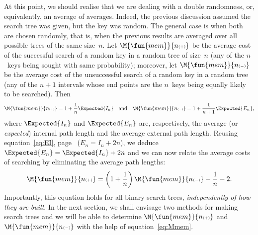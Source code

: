 At this point, we should realise that we are dealing with a double
randomness, or, equivalently, an average of averages. Indeed, the
previous discussion assumed the search tree was given, but the key was
random. The general case is when both are chosen randomly, that is,
when the previous results are averaged over all possible trees of the
same size~\(n\). Let \(\M{\fun{mem}}{n{\scriptscriptstyle (+)}}\)
 be the average
cost of the successful search of a random key in a random tree of
size~\(n\) (any of the \(n\)~keys being sought with same probability);
moreover, let \(\M{\fun{mem}}{n{\scriptscriptstyle
    (-)}}\) be the average cost of the unsuccessful search of a random
key in a random tree (any of the \(n+1\) intervals whose end points
are the \(n\)~keys being equally likely to be searched). Then
\begin{equation}
  \M{\fun{mem}}{n{\scriptscriptstyle (+)}}
  = 1 + \frac{1}{n}\Expected{I_n}
\quad\text{and}\quad
\M{\fun{mem}}{n{\scriptscriptstyle (-)}}
  = 1 + \frac{1}{n+1}\Expected{E_n},
\label{eq:Mmems}
\end{equation}
where \(\Expected{I_n}\) and \(\Expected{E_n}\) are, respectively, the
average (or \emph{expected}) internal path length and the average external path length. Reusing
equation~\eqref{eq:EI}, page~\pageref{eq:EI} (\(E_n = I_n + 2n\)), we
deduce \(\Expected{E_n} = \Expected{I_n} + 2n\) and we can now relate
the average costs of searching by eliminating the average path
lengths:
\begin{equation}
\M{\fun{mem}}{n{\scriptscriptstyle (+)}} = \left(1 + \frac{1}{n}\right)
\M{\fun{mem}}{n{\scriptscriptstyle (-)}} - \frac{1}{n} - 2.
\label{eq:Mmem}
\end{equation}
Importantly, this equation holds for all binary search trees,
\emph{independently of how they are built}. In the next section, we
shall envisage two methods for making search trees and we will be able
to determine \(\M{\fun{mem}}{n{\scriptscriptstyle (+)}}\)
 and
\(\M{\fun{mem}}{n{\scriptscriptstyle (-)}}\)
 with the help
of equation~\eqref{eq:Mmem}.

